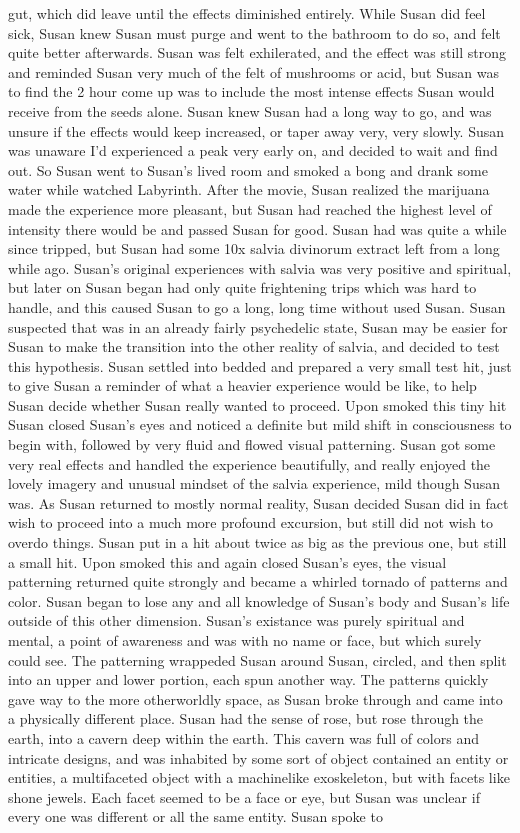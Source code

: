 \documentclass[12pt]{book}
\begin{document}
gut, which did leave until the effects diminished entirely. While Susan did feel sick, Susan knew Susan must purge and went to the bathroom to do so, and felt quite better afterwards. Susan was felt exhilerated, and the effect was still strong and reminded Susan very much of the felt of mushrooms or acid, but Susan was to find the 2 hour come up was to include the most intense effects Susan would receive from the seeds alone. Susan knew Susan had a long way to go, and was unsure if the effects would keep increased, or taper away very, very slowly. Susan was unaware I'd experienced a peak very early on, and decided to wait and find out. So Susan went to Susan's lived room and smoked a bong and drank some water while watched Labyrinth. After the movie, Susan realized the marijuana made the experience more pleasant, but Susan had reached the highest level of intensity there would be and passed Susan for good. Susan had was quite a while since tripped, but Susan had some 10x salvia divinorum extract left from a long while ago. Susan's original experiences with salvia was very positive and spiritual, but later on Susan began had only quite frightening trips which was hard to handle, and this caused Susan to go a long, long time without used Susan. Susan suspected that was in an already fairly psychedelic state, Susan may be easier for Susan to make the transition into the other reality of salvia, and decided to test this hypothesis. Susan settled into bedded and prepared a very small test hit, just to give Susan a reminder of what a heavier experience would be like, to help Susan decide whether Susan really wanted to proceed. Upon smoked this tiny hit Susan closed Susan's eyes and noticed a definite but mild shift in consciousness to begin with, followed by very fluid and flowed visual patterning. Susan got some very real effects and handled the experience beautifully, and really enjoyed the lovely imagery and unusual mindset of the salvia experience, mild though Susan was. As Susan returned to mostly normal reality, Susan decided Susan did in fact wish to proceed into a much more profound excursion, but still did not wish to overdo things. Susan put in a hit about twice as big as the previous one, but still a small hit. Upon smoked this and again closed Susan's eyes, the visual patterning returned quite strongly and became a whirled tornado of patterns and color. Susan began to lose any and all knowledge of Susan's body and Susan's life outside of this other dimension. Susan's existance was purely spiritual and mental, a point of awareness and was with no name or face, but which surely could see. The patterning wrappeded Susan around Susan, circled, and then split into an upper and lower portion, each spun another way. The patterns quickly gave way to the more otherworldly space, as Susan broke through and came into a physically different place. Susan had the sense of rose, but rose through the earth, into a cavern deep within the earth. This cavern was full of colors and intricate designs, and was inhabited by some sort of object contained an entity or entities, a multifaceted object with a machinelike exoskeleton, but with facets like shone jewels. Each facet seemed to be a face or eye, but Susan was unclear if every one was different or all the same entity. Susan spoke to 
\end{document}
